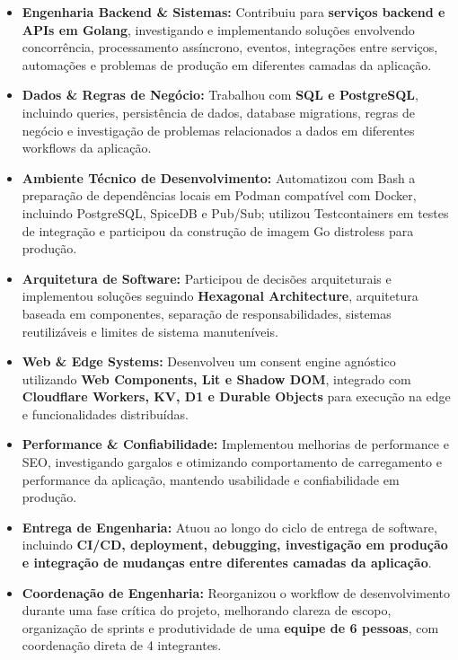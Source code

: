 \documentclass[10pt,a4paper]{article}
\begin{document}
\begin{itemize}
    \item
    \textbf{Engenharia Backend \& Sistemas:}
    Contribuiu para \textbf{serviços backend e APIs em Golang},
    investigando e implementando soluções envolvendo
    concorrência, processamento assíncrono, eventos, integrações
    entre serviços, automações e problemas de produção em
    diferentes camadas da aplicação.

    \item
    \textbf{Dados \& Regras de Negócio:}
    Trabalhou com \textbf{SQL e PostgreSQL}, incluindo queries,
    persistência de dados, database migrations, regras de negócio
    e investigação de problemas relacionados a dados em
    diferentes workflows da aplicação.

    \item
    \textbf{Ambiente Técnico de Desenvolvimento:}
    Automatizou com Bash a preparação de dependências locais em
    Podman compatível com Docker, incluindo PostgreSQL, SpiceDB e
    Pub/Sub; utilizou Testcontainers em testes de integração e
    participou da construção de imagem Go distroless para produção.

    \item
    \textbf{Arquitetura de Software:}
    Participou de decisões arquiteturais e implementou soluções
    seguindo \textbf{Hexagonal Architecture}, arquitetura baseada
    em componentes, separação de responsabilidades, sistemas
    reutilizáveis e limites de sistema manuteníveis.

    \item
    \textbf{Web \& Edge Systems:}
    Desenvolveu um consent engine agnóstico utilizando
    \textbf{Web Components, Lit e Shadow DOM}, integrado com
    \textbf{Cloudflare Workers, KV, D1 e Durable Objects}
    para execução na edge e funcionalidades distribuídas.

    \item
    \textbf{Performance \& Confiabilidade:}
    Implementou melhorias de performance e SEO, investigando
    gargalos e otimizando comportamento de carregamento e
    performance da aplicação, mantendo usabilidade e
    confiabilidade em produção.

    \item
    \textbf{Entrega de Engenharia:}
    Atuou ao longo do ciclo de entrega de software, incluindo
    \textbf{CI/CD, deployment, debugging, investigação em
    produção e integração de mudanças entre diferentes camadas
    da aplicação}.

    \item
    \textbf{Coordenação de Engenharia:}
    Reorganizou o workflow de desenvolvimento durante uma fase
    crítica do projeto, melhorando clareza de escopo, organização
    de sprints e produtividade de uma \textbf{equipe de 6 pessoas},
    com coordenação direta de 4 integrantes.

\end{itemize}
\end{document}
